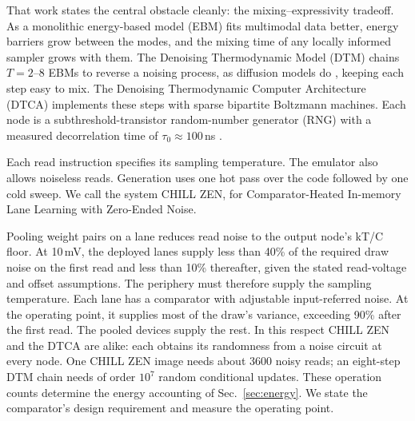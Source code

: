 \documentclass[reprint,amsmath,amssymb,aps,nofootinbib]{revtex4-2}
\begin{document}
That work states the central obstacle cleanly: the
mixing--expressivity tradeoff. As a monolithic energy-based model
(EBM) fits multimodal data better, energy barriers grow between the
modes, and the mixing time of any locally informed sampler grows with
them. The Denoising Thermodynamic Model (DTM) chains $T = 2$--$8$ EBMs to
reverse a noising process, as diffusion models do
\cite{sohldickstein2015deep,ho2020ddpm}, keeping each step easy to mix.
The Denoising Thermodynamic Computer Architecture (DTCA) implements
these steps with sparse bipartite Boltzmann machines. Each node is a
subthreshold-transistor random-number generator (RNG) with a measured
decorrelation time of $\tau_0 \approx 100$\,ns
\cite{jelincic2025dtm,freitas2025taming}.

Each read instruction specifies its sampling temperature. The emulator
also allows noiseless reads.
Generation uses one hot pass over the code followed by one cold sweep. We call the system CHILL
ZEN, for Comparator-Heated In-memory Lane Learning with Zero-Ended
Noise.

 Pooling weight pairs on a lane reduces read noise to the output node's
kT/C floor. At 10\,mV, the deployed lanes supply less than 40\% of the
required draw noise on the first read and less than 10\% thereafter,
given the stated read-voltage and offset assumptions. The periphery must therefore supply the sampling temperature. Each lane has a comparator with adjustable input-referred noise. At the
operating point, it supplies most of the draw's variance, exceeding 90\%
after the first read. The pooled devices supply the rest. In this respect CHILL ZEN and the DTCA are alike: each
obtains its randomness from a noise circuit at every node.  One CHILL ZEN image needs about 3600 noisy reads; an eight-step DTM chain needs of order $10^{7}$ random conditional updates. These operation counts determine the energy accounting of Sec.~\ref{sec:energy}. We state the comparator's design
requirement and measure the operating point.
\end{document}
